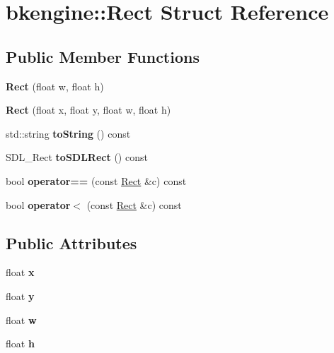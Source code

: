 \hypertarget{structbkengine_1_1Rect}{}\section{bkengine\+:\+:Rect Struct Reference}
\label{structbkengine_1_1Rect}
\subsection*{Public Member Functions}
\begin{DoxyCompactItemize}
\item 
\mbox{\label{structbkengine_1_1Rect_a7cc0661f74761aabb5e75ccb1afcb40a}} 
{\bfseries Rect} (float w, float h)
\item 
\mbox{\label{structbkengine_1_1Rect_a03207fc16543eb85f773572a5062aab4}} 
{\bfseries Rect} (float x, float y, float w, float h)
\item 
\mbox{\label{structbkengine_1_1Rect_a3be08ed9c43d955c778af45aa514673a}} 
std\+::string {\bfseries to\+String} () const
\item 
\mbox{\label{structbkengine_1_1Rect_aedbff1c8866e12bedc940d606f985bec}} 
S\+D\+L\+\_\+\+Rect {\bfseries to\+S\+D\+L\+Rect} () const
\item 
\mbox{\label{structbkengine_1_1Rect_acb4f26132777f2b17936ed0731fdc4dd}} 
bool {\bfseries operator==} (const \hyperlink{structbkengine_1_1Rect}{Rect} \&c) const
\item 
\mbox{\label{structbkengine_1_1Rect_a81f3754e289024672210140e9fa3df43}} 
bool {\bfseries operator$<$} (const \hyperlink{structbkengine_1_1Rect}{Rect} \&c) const
\end{DoxyCompactItemize}
\subsection*{Public Attributes}
\begin{DoxyCompactItemize}
\item 
\mbox{\label{structbkengine_1_1Rect_ae4f01ce0504da34b3b94e0ca409a8078}} 
float {\bfseries x}
\item 
\mbox{\label{structbkengine_1_1Rect_a09b456ee0fe84d8fa826c0f64d1fb2dc}} 
float {\bfseries y}
\item 
\mbox{\label{structbkengine_1_1Rect_adf5528e92fe470a84c126d0784531494}} 
float {\bfseries w}
\item 
\mbox{\label{structbkengine_1_1Rect_a8d2c3ae96862607e7fd81e90ae0024b0}} 
float {\bfseries h}
\end{DoxyCompactItemize}


